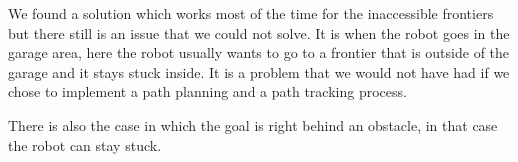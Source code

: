 We found a solution which works most of the time for the inaccessible frontiers but there still is an issue that we could not solve.
It is when the robot goes in the garage area, here the robot usually wants to go to a frontier that is outside of the garage and it stays stuck inside.
It is a problem that we would not have had if we chose to implement a path planning and a path tracking process.

There is also the case in which the goal is right behind an obstacle, in that case the robot can stay stuck.
